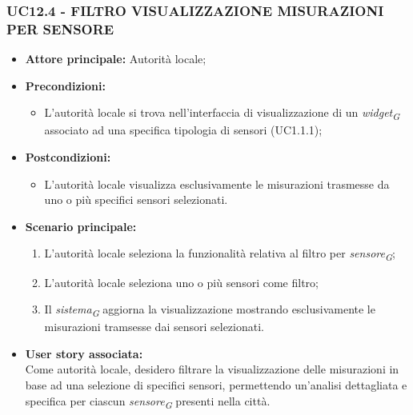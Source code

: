 \subsubsection{UC12.4 - FILTRO VISUALIZZAZIONE MISURAZIONI PER SENSORE}
\begin{itemize}
    \item \textbf{Attore principale:} Autorità locale;
    \item \textbf{Precondizioni:}
        \begin{itemize}
            \item L'autorità locale si trova nell'interfaccia di visualizzazione di un \textit{widget}\textsubscript{\textit{G}} associato ad una specifica tipologia di sensori (UC1.1.1);
        \end{itemize}
    \item \textbf{Postcondizioni:}
        \begin{itemize}
            \item L'autorità locale visualizza esclusivamente le misurazioni trasmesse da uno o più specifici sensori selezionati.
        \end{itemize}
    \item \textbf{Scenario principale:}
        \begin{enumerate}
            \item L'autorità locale seleziona la funzionalità relativa al filtro per \textit{sensore}\textsubscript{\textit{G}};
            \item L'autorità locale seleziona uno o più sensori come filtro;
            \item Il \textit{sistema}\textsubscript{\textit{G}} aggiorna la visualizzazione mostrando esclusivamente le misurazioni tramsesse dai sensori selezionati.
        \end{enumerate}
    \item \textbf{User story associata:} \\
        Come autorità locale, desidero filtrare la visualizzazione delle misurazioni in base ad una selezione di specifici sensori, permettendo un'analisi dettagliata e specifica per ciascun \textit{sensore}\textsubscript{\textit{G}} presenti nella città.
\end{itemize}
